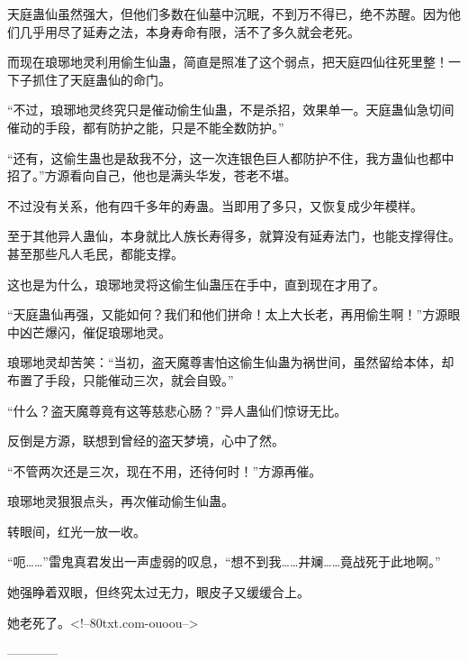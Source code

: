 \begin{this_body}
天庭蛊仙虽然强大，但他们多数在仙墓中沉眠，不到万不得已，绝不苏醒。因为他们几乎用尽了延寿之法，本身寿命有限，活不了多久就会老死。

而现在琅琊地灵利用偷生仙蛊，简直是照准了这个弱点，把天庭四仙往死里整！一下子抓住了天庭蛊仙的命门。

“不过，琅琊地灵终究只是催动偷生仙蛊，不是杀招，效果单一。天庭蛊仙急切间催动的手段，都有防护之能，只是不能全数防护。”

“还有，这偷生蛊也是敌我不分，这一次连银色巨人都防护不住，我方蛊仙也都中招了。”方源看向自己，他也是满头华发，苍老不堪。

不过没有关系，他有四千多年的寿蛊。当即用了多只，又恢复成少年模样。

至于其他异人蛊仙，本身就比人族长寿得多，就算没有延寿法门，也能支撑得住。甚至那些凡人毛民，都能支撑。

这也是为什么，琅琊地灵将这偷生仙蛊压在手中，直到现在才用了。

“天庭蛊仙再强，又能如何？我们和他们拼命！太上大长老，再用偷生啊！”方源眼中凶芒爆闪，催促琅琊地灵。

琅琊地灵却苦笑：“当初，盗天魔尊害怕这偷生仙蛊为祸世间，虽然留给本体，却布置了手段，只能催动三次，就会自毁。”

“什么？盗天魔尊竟有这等慈悲心肠？”异人蛊仙们惊讶无比。

反倒是方源，联想到曾经的盗天梦境，心中了然。

“不管两次还是三次，现在不用，还待何时！”方源再催。

琅琊地灵狠狠点头，再次催动偷生仙蛊。

转眼间，红光一放一收。

“呃……”雷鬼真君发出一声虚弱的叹息，“想不到我……井斓……竟战死于此地啊。”

她强睁着双眼，但终究太过无力，眼皮子又缓缓合上。

她老死了。<!--80txt.com-ouoou-->

------------

\end{this_body}

